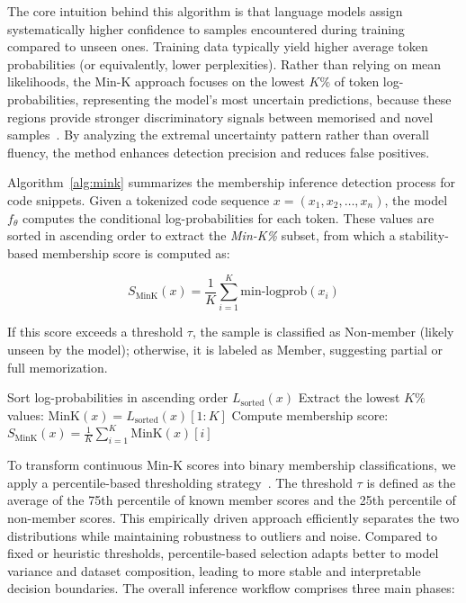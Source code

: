 \documentclass[preprint,12pt]{elsarticle}
\begin{document}
The core intuition behind this algorithm is that language models assign systematically higher confidence to samples encountered during training compared to unseen ones. Training data typically yield higher average token probabilities (or equivalently, lower perplexities). Rather than relying on mean likelihoods, the Min-K approach focuses on the lowest \( K\% \) of token log-probabilities, representing the model’s most uncertain predictions, because these regions provide stronger discriminatory signals between memorised and novel samples~\cite{r1}. By analyzing the extremal uncertainty pattern rather than overall fluency, the method enhances detection precision and reduces false positives.


Algorithm~\ref{alg:mink} summarizes the membership inference detection process for code snippets. Given a tokenized code sequence \( x = (x_1, x_2, \ldots, x_n) \), the model \( f_{\theta} \) computes the conditional log-probabilities for each token. These values are sorted in ascending order to extract the \textit{Min-K\%} subset, from which a stability-based membership score is computed as:

\[
S_{\text{MinK}}(x) = \frac{1}{K} \sum_{i=1}^{K} \text{min-logprob}(x_i)
\]

If this score exceeds a threshold \( \tau \), the sample is classified as Non-member (likely unseen by the model); otherwise, it is labeled as Member, suggesting partial or full memorization.

\begin{algorithm}[H]
\caption{Membership Inference Detection for Code Snippets}
\label{alg:mink}

Sort log-probabilities in ascending order \( L_{\text{sorted}}(x) \)\;
Extract the lowest \( K\% \) values: \( \text{MinK}(x) = L_{\text{sorted}}(x)[1:K] \)\;
Compute membership score: \( S_{\text{MinK}}(x) = \frac{1}{K} \sum_{i=1}^{K} \text{MinK}(x)[i] \)\;
\end{algorithm}


To transform continuous Min-K scores into binary membership classifications, we apply a percentile-based thresholding strategy~\cite{r2}. The threshold \( \tau \) is defined as the average of the 75th percentile of known member scores and the 25th percentile of non-member scores. This empirically driven approach efficiently separates the two distributions while maintaining robustness to outliers and noise. Compared to fixed or heuristic thresholds, percentile-based selection adapts better to model variance and dataset composition, leading to more stable and interpretable decision boundaries.
The overall inference workflow comprises three main phases:
\end{document}
